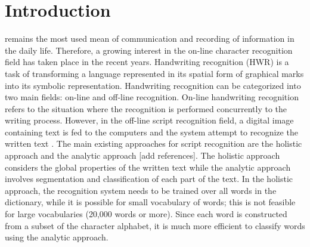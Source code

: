 \documentclass[12pt,journal,compsoc]{IEEEtran}
\begin{document}
\section{Introduction}

 remains the most used mean of communication and recording of information in the daily life. Therefore, a growing interest in the on-line character recognition field has taken place in the recent years.
Handwriting recognition (HWR) is a task of transforming a language represented in its spatial form of graphical marks into its symbolic representation. Handwriting recognition can be categorized into two main fields: on-line and off-line recognition. On-line handwriting recognition refers to the situation where the recognition is performed concurrently to the writing process. However, in the off-line script recognition field, a digital image containing text is fed to the computers and the system attempt to recognize the written text \cite{al2011online}. The main existing approaches for script recognition are the holistic approach \cite{biadsy2011segmentation} and the analytic approach [add references]. The holistic approach considers the global properties of the written text while the analytic approach involves segmentation and classification of each part of the text.  In the holistic approach, the recognition system needs to be trained over all words in the dictionary, while it is possible for small vocabulary of words; this is not feasible for large vocabularies (20,000 words or more). Since each word is constructed from a subset of the character alphabet, it is much more efficient to classify words using the analytic approach. \cite{elanwar2012unconstrained} \\
\end{document}
